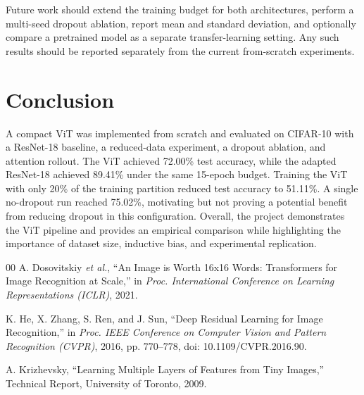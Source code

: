 \documentclass[conference]{IEEEtran}
\begin{document}
Future work should extend the training budget for both architectures, perform a multi-seed dropout ablation, report mean and standard deviation, and optionally compare a pretrained model as a separate transfer-learning setting. Any such results should be reported separately from the current from-scratch experiments.

\section{Conclusion}
A compact ViT was implemented from scratch and evaluated on CIFAR-10 with a ResNet-18 baseline, a reduced-data experiment, a dropout ablation, and attention rollout. The ViT achieved 72.00\% test accuracy, while the adapted ResNet-18 achieved 89.41\% under the same 15-epoch budget. Training the ViT with only 20\% of the training partition reduced test accuracy to 51.11\%. A single no-dropout run reached 75.02\%, motivating but not proving a potential benefit from reducing dropout in this configuration. Overall, the project demonstrates the ViT pipeline and provides an empirical comparison while highlighting the importance of dataset size, inductive bias, and experimental replication.

\begin{thebibliography}{00}
A. Dosovitskiy \emph{et al.}, ``An Image is Worth 16x16 Words: Transformers for Image Recognition at Scale,'' in \emph{Proc. International Conference on Learning Representations (ICLR)}, 2021.

K. He, X. Zhang, S. Ren, and J. Sun, ``Deep Residual Learning for Image Recognition,'' in \emph{Proc. IEEE Conference on Computer Vision and Pattern Recognition (CVPR)}, 2016, pp. 770--778, doi: 10.1109/CVPR.2016.90.

A. Krizhevsky, ``Learning Multiple Layers of Features from Tiny Images,'' Technical Report, University of Toronto, 2009.
\end{thebibliography}
\end{document}
